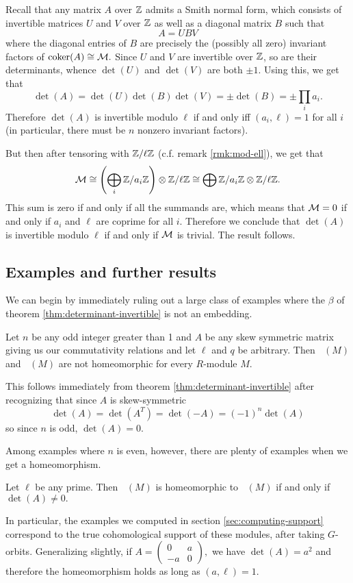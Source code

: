\documentclass [11pt, proquest] {uwthesis}[2020/02/24]
\DeclareMathOperator{\suppc}{supp^\mathit{coh}_R}
\DeclareMathOperator{\supprR}{supp^\mathit{rnk}_R}
\begin{document}
{\begin{prf}
        Recall that any matrix $A$ over $\mathbb{Z}$ admits a Smith normal form, which consists of invertible matrices $U$ and $V$ over $\mathbb{Z}$ as well as a diagonal matrix $B$ such that
        \[A=UBV\]
        where the diagonal entries of $B$ are precisely the (possibly all zero) invariant factors of $\operatorname{coker}(A)\cong\mathcal{M}.$ Since $U$ and $V$ are invertible over $\mathbb{Z}$, so are their determinants, whence $\det(U)$ and $\det(V)$ are both $\pm 1.$ Using this, we get that 
        \[\det(A)=\det(U)\det(B)\det(V)=\pm\det(B)=\pm\prod_i a_i.\]
        Therefore $\det(A)$ is invertible modulo $\ell$ if and only iff $(a_i,\ell)=1$ for all $i$ (in particular, there must be $n$ nonzero invariant factors).
        
        But then after tensoring with $\mathbb{Z}/\ell\mathbb{Z}$ (c.f. remark \ref{rmk:mod-ell}), we get that
        \[\mathcal{M}\cong \left(\bigoplus_i \mathbb{Z}/a_i\mathbb{Z}\right)\otimes\mathbb{Z}/\ell\mathbb{Z}\cong\bigoplus\mathbb{Z}/a_i\mathbb{Z}\otimes\mathbb{Z}/\ell\mathbb{Z}.\]
        This sum is zero if and only if all the summands are, which means that $\mathcal{M}=0$ if and only if $a_i$ and $\ell$ are coprime for all $i$. Therefore we conclude that $\det(A)$ is invertible modulo $\ell$ if and only if $\mathcal{M}$ is trivial. The result follows.
    \end{prf}

    \subsection{Examples and further results}
    We can begin by immediately ruling out a large class of examples where the $\beta$ of theorem \ref{thm:determinant-invertible} is not an embedding. 
    \begin{cor}
        Let $n$ be any odd integer greater than 1 and $A$ be any skew symmetric matrix giving us our commutativity relations and let $\ell$ and $q$ be arbitrary. Then $\suppc(M)$ and $\supprR(M)$ are not homeomorphic for every $R$-module $M$.
    \end{cor}
    \begin{prf}
        This follows immediately from theorem \ref{thm:determinant-invertible} after recognizing that since $A$ is skew-symmetric
        \[\det(A)=\det(A^T)=\det(-A)=(-1)^n\det(A)\]
        so since $n$ is odd, $\det(A)=0.$
    \end{prf}
    
    Among examples where $n$ is even, however, there are plenty of examples when we get a homeomorphism.
    \begin{cor}
        Let $\ell$ be any prime. Then $\suppc(M)$ is homeomorphic to $\supprR(M)$ if and only if $\det(A)\ne0.$
    \end{cor}
    In particular, the examples we computed in section \ref{sec:computing-support} correspond to the true cohomological support of these modules, after taking $G$-orbits. Generalizing slightly, if $A=(\begin{smallmatrix}
        0 & a\\-a &0
    \end{smallmatrix}),$ we have $\det(A)=a^2$ and therefore the homeomorphism holds as long as $(a,\ell)=1.$
    
}
\end{document}

